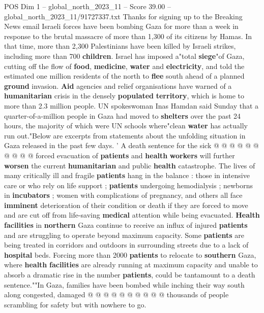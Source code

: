 \begin{textsample}{POS Dim 1 – global\_north\_2023\_11 – Score 39.00 – global\_north\_2023\_11/91727337.txt}  \label{ex:f1_pos_257}
Thanks for signing up to the Breaking News email Israeli forces have been bombing Gaza for more than a week in response to the brutal massacre of more than 1,300 of its citizens by Hamas.
In that time, more than 2,300 Palestinians have been killed by Israeli strikes, including more than 700 \textbf{children}.
Israel has imposed a"total \textbf{siege}"of Gaza, cutting off the flow of \textbf{food}, \textbf{medicine}, \textbf{water} and \textbf{electricity}, and told the estimated one million residents of the north to \textbf{flee} south ahead of a planned \textbf{ground} invasion. \textbf{Aid} agencies and relief organisations have warned of a \textbf{humanitarian} crisis in the densely \textbf{populated} \textbf{territory}, which is home to more than 2.3 million people.
UN spokeswoman Inas Hamdan said Sunday that a quarter-of-a-million people in Gaza had moved to \textbf{shelters} over the past 24 hours, the majority of which were UN schools where"clean \textbf{water} has actually run out."Below are excerpts from statements about the unfolding situation in Gaza released in the past few days. ' A death sentence for the sick @ @ @ @ @ @ @ @ @ @ forced evacuation of \textbf{patients} and \textbf{health} \textbf{workers} will further \textbf{worsen} the current \textbf{humanitarian} and public \textbf{health} catastrophe.
The lives of many critically ill and fragile \textbf{patients} hang in the balance : those in intensive care or who rely on life support ; \textbf{patients} undergoing hemodialysis ; newborns in \textbf{incubators} ; women with complications of pregnancy, and others all face \textbf{imminent} deterioration of their condition or death if they are forced to move and are cut off from life-saving \textbf{medical} attention while being evacuated. \textbf{Health} \textbf{facilities} in \textbf{northern} Gaza continue to receive an influx of injured \textbf{patients} and are struggling to operate beyond maximum capacity.
Some \textbf{patients} are being treated in corridors and outdoors in surrounding streets due to a lack of \textbf{hospital} beds.
Forcing more than 2000 \textbf{patients} to relocate to \textbf{southern} Gaza, where \textbf{health} \textbf{facilities} are already running at maximum capacity and unable to absorb a dramatic rise in the number \textbf{patients}, could be tantamount to a death sentence.""In Gaza, families have been bombed while inching their way south along congested, damaged @ @ @ @ @ @ @ @ @ @ thousands of people scrambling for safety but with nowhere to go.

\end{textsample}
